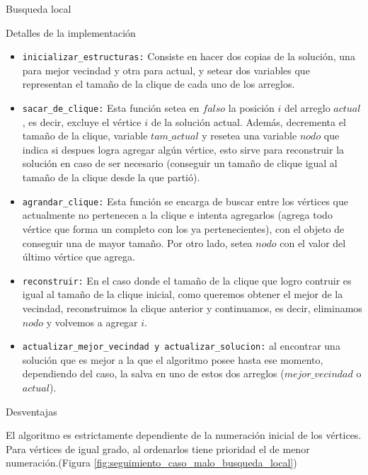 \begin{section}{Busqueda local}
\begin{subsection}{Detalles de la implementación}
		\begin{itemize}
			\item \texttt{inicializar\_estructuras:} Consiste en hacer dos copias de la solución, una para mejor vecindad y otra para actual, y setear dos variables que representan el tamaño de la clique de cada uno de los arreglos.
		
			\item \texttt{sacar\_de\_clique:} Esta función setea en $falso$ la posición $i$ del arreglo $actual$, es decir, excluye el vértice $i$ de la solución actual. Además, decrementa el tamaño de la clique, variable $tam\_actual$ y resetea una variable $nodo$ que indica si despues logra agregar algún vértice, esto sirve para reconstruir la solución en caso de ser necesario (conseguir un tamaño de clique igual al tamaño de la clique desde la que partió).

			\item \texttt{agrandar\_clique:} Esta función se encarga de buscar entre los vértices que actualmente no pertenecen a la clique e intenta agregarlos (agrega todo vértice que forma un completo con los ya pertenecientes), con el objeto de conseguir una de mayor tamaño. Por otro lado, setea $nodo$ con el valor del último vértice que agrega.

			\item \texttt{reconstruir:} En el caso donde el tamaño de la clique que logro contruir es igual al tamaño de la clique inicial, como queremos obtener el mejor de la vecindad, reconstruimos la clique anterior y continuamos, es decir, eliminamos $nodo$ y volvemos a agregar $i$.
			
			\item \texttt{actualizar\_mejor\_vecindad y actualizar\_solucion:} al encontrar una solución que es mejor a la que el algoritmo posee hasta ese momento, dependiendo del caso, la salva en uno de estos dos arreglos ($mejor\_vecindad$ o $actual$).
			
		\end{itemize}
		\end{subsection}
		\begin{subsection}{Desventajas}
		
		El algoritmo es estrictamente dependiente de la numeración inicial de los vértices. Para vértices de igual grado, al ordenarlos tiene prioridad el de menor numeración.(Figura \ref{fig:seguimiento_caso_malo_busqueda_local})


\end{subsection}
\end{section}
